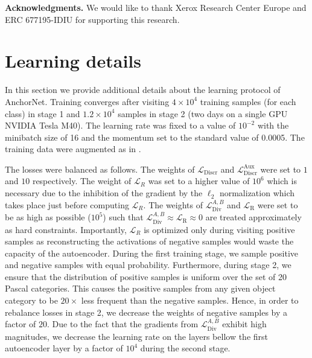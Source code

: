 \documentclass[10pt,twocolumn,letterpaper]{article}
\newcommand{\myparagraph}[1]{\vspace{0.15cm}\noindent\textbf{#1.}}
\begin{document}
\myparagraph{Acknowledgments} We would like to thank Xerox Research Center Europe and ERC 677195-IDIU for supporting this research.

\appendix
\renewcommand{\thetable}{\Alph{table}}\renewcommand{\thefigure}{\Alph{figure}}\section{Learning details}

In this section we provide additional details about the learning protocol of AnchorNet.
Training converges after visiting $4 \times 10^4$ training samples (for each class) in stage 1 and $1.2 \times10^4$ samples in stage 2 (two days on a single GPU NVIDIA Tesla M40). 
The learning rate was fixed to a value of $10^{-2}$ with the minibatch size of 16 and the momentum set to the standard value of 0.0005.
The training data were augmented as in \cite{he2015deep}.

The losses were balanced as follows. 
The weights of $\mathcal{L}_{\text{Discr}}$ and $\mathcal{L}_{\text{Discr}}^\text{Aux}$ were set to $1$ and $10$ respectively.
The weight of $\mathcal{L}_R$ was set to a higher value of $10^6$ which is necessary due to the inhibition of the gradient by the $\ell_2$ normalization which takes place just before computing $\mathcal{L}_R$. The weights of $\mathcal{L}_{\text{Div}}^{A,B}$ and $\mathcal{L}_{\text{R}}$ were set to be as high as possible ($10^5$) such that 
$\mathcal{L}_{\text{Div}}^{A,B}\approx \mathcal{L}_{\text{R}} \approx 0$ are treated approximately as hard constraints. 
Importantly, $\mathcal{L}_R$ is optimized only during visiting positive samples as reconstructing the activations of negative samples would waste the capacity of the autoencoder.
During the first training stage, we sample positive and negative samples with equal probability. Furthermore, during stage 2, we ensure that the distribution of positive samples
is uniform over the set of 20 Pascal categories. This causes the positive samples from any given object category to be $20 \times$ less frequent than the negative samples. Hence, in order to rebalance losses in stage 2, we decrease the weights of negative samples by a factor of $20$.
Due to the fact that the gradients from $\mathcal{L}_{\text{Div}}^{A,B}$ exhibit high magnitudes, we decrease the learning rate on the layers bellow the first autoencoder layer
by a factor of $10^4$ during the second stage.
\end{document}
